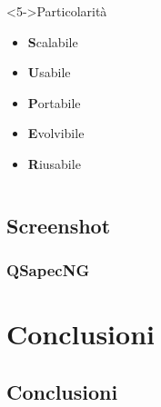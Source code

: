 \begin{frame}
\begin{columns}[B]

   \begin{block}<5->{Particolarità}
    \begin{itemize}
     \item \textbf{S}calabile
     \item \textbf{U}sabile
     \item \textbf{P}ortabile
     \item \textbf{E}volvibile
     \item \textbf{R}iusabile
    \end{itemize}
   \end{block}

 \end{columns}

\end{frame}


\subsection{Screenshot}


\begin{frame}
 \frametitle{QSapecNG}

 \begin{center}\begin{overprint}
 \end{overprint}\end{center}

\end{frame}


\section{Conclusioni}

\subsection{Conclusioni}


